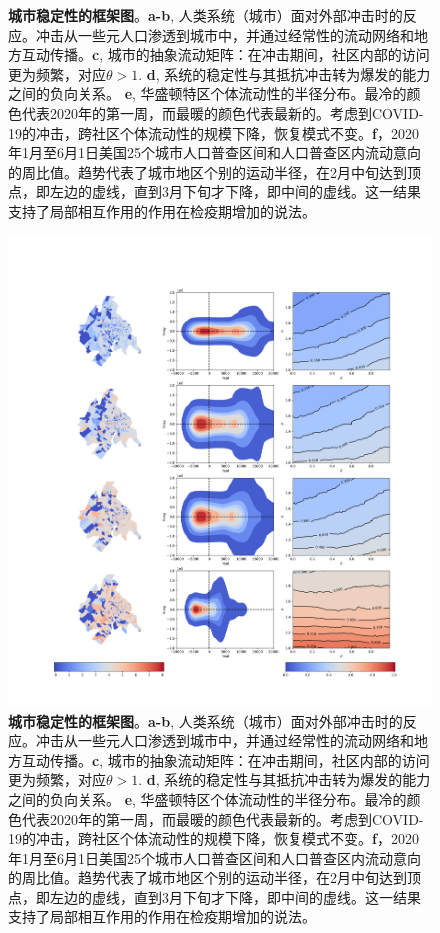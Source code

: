 \begin{figure}
    \caption{\textbf{城市稳定性的框架图}。\textbf{a-b}, 人类系统（城市）面对外部冲击时的反应。冲击从一些元人口渗透到城市中，并通过经常性的流动网络和地方互动传播。\textbf{c}, 城市的抽象流动矩阵：在冲击期间，社区内部的访问更为频繁，对应$\theta > 1$. \textbf{d}, 系统的稳定性与其抵抗冲击转为爆发的能力之间的负向关系。 \textbf{e}, 华盛顿特区个体流动性的半径分布。最冷的颜色代表2020年的第一周，而最暖的颜色代表最新的。考虑到COVID-19的冲击，跨社区个体流动性的规模下降，恢复模式不变。\textbf{f}，2020年1月至6月1日美国25个城市人口普查区间和人口普查区内流动意向的周比值。趋势代表了城市地区个别的运动半径，在2月中旬达到顶点，即左边的虚线，直到3月下旬才下降，即中间的虚线。这一结果支持了局部相互作用的作用在检疫期增加的说法。}
    \label{fig:allee1}
\end{figure}

\begin{figure}
    \centering
    \includegraphics[width = 0.9\linewidth]{Figs/Figure3.png}
    \caption{\textbf{城市稳定性的框架图}。\textbf{a-b}, 人类系统（城市）面对外部冲击时的反应。冲击从一些元人口渗透到城市中，并通过经常性的流动网络和地方互动传播。\textbf{c}, 城市的抽象流动矩阵：在冲击期间，社区内部的访问更为频繁，对应$\theta > 1$. \textbf{d}, 系统的稳定性与其抵抗冲击转为爆发的能力之间的负向关系。 \textbf{e}, 华盛顿特区个体流动性的半径分布。最冷的颜色代表2020年的第一周，而最暖的颜色代表最新的。考虑到COVID-19的冲击，跨社区个体流动性的规模下降，恢复模式不变。\textbf{f}，2020年1月至6月1日美国25个城市人口普查区间和人口普查区内流动意向的周比值。趋势代表了城市地区个别的运动半径，在2月中旬达到顶点，即左边的虚线，直到3月下旬才下降，即中间的虚线。这一结果支持了局部相互作用的作用在检疫期增加的说法。}
    \label{fig:allee1}
\end{figure}


